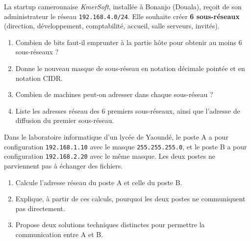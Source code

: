 \documentclass[11pt]{article}
\begin{document}
\begin{exercice}
La startup camerounaise \emph{KmerSoft}, installée à Bonanjo (Douala), reçoit de son administrateur le réseau \texttt{192.168.4.0/24}. Elle souhaite créer \textbf{6 sous-réseaux} (direction, développement, comptabilité, accueil, salle serveurs, invités).
\begin{enumerate}
\item Combien de bits faut-il emprunter à la partie hôte pour obtenir au moins 6 sous-réseaux ?
\item Donne le nouveau masque de sous-réseau en notation décimale pointée et en notation CIDR.
\item Combien de machines peut-on adresser dans chaque sous-réseau ?
\item Liste les adresses réseau des 6 premiers sous-réseaux, ainsi que l'adresse de diffusion du premier sous-réseau.
\end{enumerate}
\end{exercice}

\begin{exercice}
Dans le laboratoire informatique d'un lycée de Yaoundé, le poste A a pour configuration \texttt{192.168.1.10} avec le masque \texttt{255.255.255.0}, et le poste B a pour configuration \texttt{192.168.2.20} avec le même masque. Les deux postes ne parviennent pas à échanger des fichiers.
\begin{enumerate}
\item Calcule l'adresse réseau du poste A et celle du poste B.
\item Explique, à partir de ces calculs, pourquoi les deux postes ne communiquent pas directement.
\item Propose deux solutions techniques distinctes pour permettre la communication entre A et B.
\end{enumerate}
\end{exercice}
\end{document}
